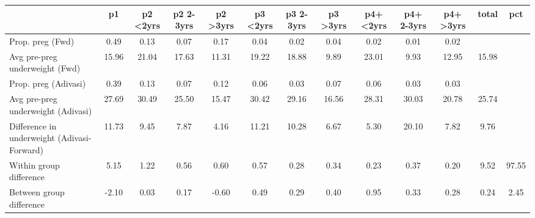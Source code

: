 \begin{tabular}{l*{12}{c}}
\toprule
            &\multicolumn{1}{c}{p1}&\multicolumn{1}{c}{p2 \textless2yrs}&\multicolumn{1}{c}{p2 2-3yrs}&\multicolumn{1}{c}{p2 \textgreater3yrs}&\multicolumn{1}{c}{p3 \textless2yrs}&\multicolumn{1}{c}{p3 2-3yrs}&\multicolumn{1}{c}{p3 \textgreater3yrs}&\multicolumn{1}{c}{p4+ \textless2yrs}&\multicolumn{1}{c}{p4+ 2-3yrs}&\multicolumn{1}{c}{p4+ \textgreater3yrs}&\multicolumn{1}{c}{total}&\multicolumn{1}{c}{pct}\\
\midrule
\midrule
Prop. preg (Fwd)&        0.49&        0.13&        0.07&        0.17&        0.04&        0.02&        0.04&        0.02&        0.01&        0.02&            &            \\
Avg pre-preg underweight (Fwd)&       15.96&       21.04&       17.63&       11.31&       19.22&       18.88&        9.89&       23.01&        9.93&       12.95&       15.98&            \\
Prop. preg (Adivasi)&        0.39&        0.13&        0.07&        0.12&        0.06&        0.03&        0.07&        0.06&        0.03&        0.03&            &            \\
Avg pre-preg underweight (Adivasi)&       27.69&       30.49&       25.50&       15.47&       30.42&       29.16&       16.56&       28.31&       30.03&       20.78&       25.74&            \\
Difference in underweight (Adivasi-Forward)&       11.73&        9.45&        7.87&        4.16&       11.21&       10.28&        6.67&        5.30&       20.10&        7.82&        9.76&            \\
Within group difference&        5.15&        1.22&        0.56&        0.60&        0.57&        0.28&        0.34&        0.23&        0.37&        0.20&        9.52&       97.55\\
Between group difference&       -2.10&        0.03&        0.17&       -0.60&        0.49&        0.29&        0.40&        0.95&        0.33&        0.28&        0.24&        2.45\\
\bottomrule
\end{tabular}
